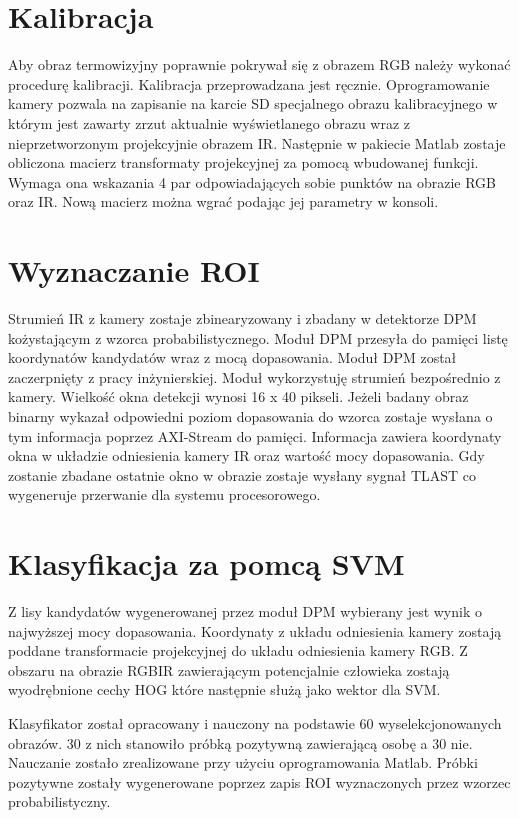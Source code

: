 \section{Kalibracja}
Aby obraz termowizyjny poprawnie pokrywał się z obrazem RGB należy wykonać procedurę kalibracji. Kalibracja przeprowadzana jest ręcznie. Oprogramowanie kamery pozwala na zapisanie na karcie SD specjalnego obrazu kalibracyjnego w którym jest zawarty zrzut aktualnie wyświetlanego obrazu wraz z nieprzetworzonym projekcyjnie obrazem IR. Następnie w pakiecie Matlab zostaje obliczona macierz transformaty projekcyjnej za pomocą wbudowanej funkcji. Wymaga ona wskazania 4 par odpowiadających sobie punktów na obrazie RGB oraz IR. Nową macierz można wgrać podając jej parametry w konsoli. 


\section{Wyznaczanie ROI}
Strumień IR z kamery zostaje zbinearyzowany i zbadany w detektorze DPM kożystającym z wzorca probabilistycznego. Moduł DPM przesyła do pamięci listę koordynatów kandydatów wraz z mocą dopasowania. Moduł DPM został zaczerpnięty z pracy inżynierskiej. Moduł wykorzystuję strumień bezpośrednio z kamery. Wielkość okna detekcji wynosi 16 x 40 pikseli. Jeżeli badany obraz binarny wykazał odpowiedni poziom dopasowania do wzorca zostaje wysłana o tym informacja poprzez AXI-Stream do pamięci. Informacja zawiera koordynaty okna w układzie odniesienia kamery IR oraz wartość mocy dopasowania. Gdy zostanie zbadane ostatnie okno w obrazie zostaje wysłany sygnał TLAST co wygeneruje przerwanie dla systemu procesorowego.

\section{Klasyfikacja za pomcą SVM}
Z lisy kandydatów wygenerowanej przez moduł DPM wybierany jest wynik o najwyższej mocy dopasowania. Koordynaty z układu odniesienia kamery zostają poddane transformacie projekcyjnej do układu odniesienia kamery RGB. Z obszaru na obrazie RGBIR zawierającym potencjalnie człowieka zostają wyodrębnione cechy HOG które następnie służą jako wektor dla SVM.

Klasyfikator został opracowany i nauczony na podstawie 60 wyselekcjonowanych obrazów. 30 z nich stanowiło próbką pozytywną zawierającą osobę a 30 nie. Nauczanie zostało zrealizowane przy użyciu oprogramowania Matlab. Próbki pozytywne zostały wygenerowane poprzez zapis ROI wyznaczonych przez wzorzec probabilistyczny. 

